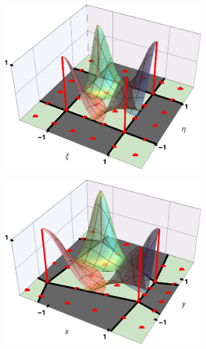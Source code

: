 \begin{figure}[ht]
   \centering
   \begin{subfigure}[b]{0.44\textwidth}
       \centering
       \includegraphics[width=0.94\textwidth]{Slike/elmFuncs3d}
       \vspace{0mm}
       \caption{}
   \end{subfigure}
   \hspace{3mm}
   \begin{subfigure}[b]{0.45\textwidth}
       \centering
       \includegraphics[width=0.94\textwidth]{Slike/elmFuncs3dTrans}
       \caption{}
   \end{subfigure}
   \caption{}
   \label{fig:shapeFs}
\end{figure}

